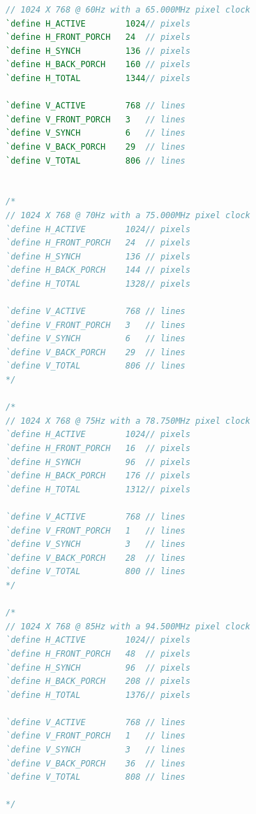 \documentclass{ctexart}
\begin{document}
\begin{lstlisting}[language=Verilog,caption=SVGA\_DEFINES.v]
// 1024 X 768 @ 60Hz with a 65.000MHz pixel clock
`define H_ACTIVE		1024// pixels
`define H_FRONT_PORCH	24	// pixels
`define H_SYNCH			136	// pixels
`define H_BACK_PORCH	160	// pixels
`define H_TOTAL			1344// pixels

`define V_ACTIVE		768	// lines
`define V_FRONT_PORCH	3	// lines
`define V_SYNCH			6	// lines
`define V_BACK_PORCH	29	// lines
`define V_TOTAL			806	// lines


/*
// 1024 X 768 @ 70Hz with a 75.000MHz pixel clock
`define H_ACTIVE		1024// pixels
`define H_FRONT_PORCH	24	// pixels
`define H_SYNCH			136	// pixels
`define H_BACK_PORCH	144	// pixels
`define H_TOTAL			1328// pixels

`define V_ACTIVE		768	// lines
`define V_FRONT_PORCH	3	// lines
`define V_SYNCH			6	// lines
`define V_BACK_PORCH	29	// lines
`define V_TOTAL			806	// lines
*/

/*
// 1024 X 768 @ 75Hz with a 78.750MHz pixel clock
`define H_ACTIVE		1024// pixels
`define H_FRONT_PORCH	16	// pixels
`define H_SYNCH			96	// pixels
`define H_BACK_PORCH	176	// pixels
`define H_TOTAL			1312// pixels

`define V_ACTIVE		768	// lines
`define V_FRONT_PORCH	1	// lines
`define V_SYNCH			3	// lines
`define V_BACK_PORCH	28	// lines
`define V_TOTAL			800	// lines
*/

/*
// 1024 X 768 @ 85Hz with a 94.500MHz pixel clock
`define H_ACTIVE		1024// pixels
`define H_FRONT_PORCH	48	// pixels
`define H_SYNCH			96	// pixels
`define H_BACK_PORCH	208	// pixels
`define H_TOTAL			1376// pixels

`define V_ACTIVE		768	// lines
`define V_FRONT_PORCH	1	// lines
`define V_SYNCH			3	// lines
`define V_BACK_PORCH	36	// lines
`define V_TOTAL			808	// lines

*/
            \end{lstlisting}
\end{document}
